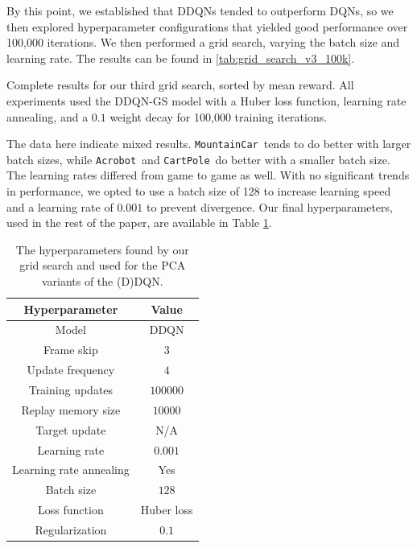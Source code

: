 \documentclass[11pt]{article}
\newcommand{\cp}{\texttt{CartPole}}
\newcommand{\ab}{\texttt{Acrobot}}
\newcommand{\mc}{\texttt{MountainCar}}
\begin{document}
By this point, we established that DDQNs tended to outperform DQNs, so we then explored hyperparameter configurations that yielded good performance over 100,000 iterations. We then performed a grid search, varying the batch size and learning rate. The results can be found in \ref{tab:grid_search_v3_100k}.

\begin{table}[!ht]
    \footnotesize
    \centering
    
    
    \caption{Complete results for our third grid search, sorted by mean reward. All experiments used the DDQN-GS model with a Huber loss function, learning rate annealing, and a $0.1$ weight decay for 100,000 training iterations.}
    \label{tab:grid_search_v3_100k}
\end{table}

The data here indicate mixed results. \mc~tends to do better with larger batch sizes, while \ab~and \cp~do better with a smaller batch size. The learning rates differed from game to game as well. With no significant trends in performance, we opted to use a batch size of 128 to increase learning speed and a learning rate of $0.001$ to prevent divergence. Our final hyperparameters, used in the rest of the paper, are available in Table \ref{tab:grid_search_hyperparameters}.

\begin{table}[!ht]
    \footnotesize
    \centering
    \begin{tabular}{c|c}
        \toprule
        Hyperparameter & Value \\ \midrule
        Model & DDQN \\
        Frame skip & $3$ \\
        Update frequency & $4$ \\
        Training updates & $100000$ \\
        Replay memory size & $10000$ \\
        Target update & N/A \\
        Learning rate & $0.001$ \\
        Learning rate annealing & Yes \\
        Batch size & $128$ \\
        Loss function & Huber loss \\
        Regularization & $0.1$ \\
        \bottomrule
    \end{tabular}
    \caption{The hyperparameters found by our grid search and used for the PCA variants of the (D)DQN.}
    \label{tab:grid_search_hyperparameters}
\end{table}
\end{document}
